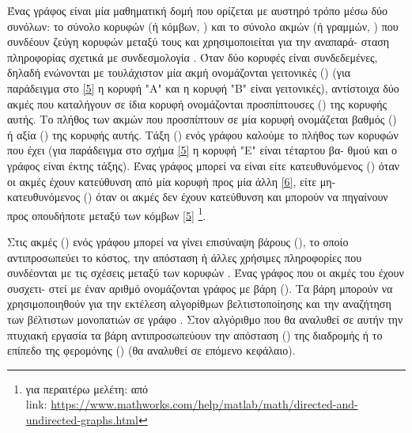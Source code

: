 Ένας γράφος είναι μία μαθηματική δομή που ορίζεται με αυστηρό τρόπο μέσω δύο συνόλων: το σύνολο κορυφών (ή κόμβων, ) και το σύνολο ακμών (ή γραμμών, ) που συνδέουν ζεύγη κορυφών μεταξύ τους και χρησιμοποιείται για την αναπαρά- σταση πληροφορίας σχετικά με συνδεσμολογία \cite{ntenisiwtis2023thewria}. Όταν δύο κορυφές είναι συνδεδεμένες, δηλαδή ενώνονται με τουλάχιστον μία ακμή ονομάζονται γειτονικές () (για παράδειγμα στο \ref{5} η κορυφή "Α" και η κορυφή "Β" είναι γειτονικές), αντίστοιχα δύο ακμές που καταλήγουν σε ίδια κορυφή ονομάζονται προσπίπτουσες () της κορυφής αυτής. Το πλήθος των ακμών που προσπίπτουν σε μία κορυφή ονομάζεται βαθμός () ή αξία () της κορυφής αυτής. Τάξη () ενός γράφου καλούμε το πλήθος των κορυφών που έχει (για παράδειγμα στο σχήμα \ref{5} η κορυφή "Ε" είναι τέταρτου βα- θμού και ο γράφος είναι έκτης τάξης). Ένας γράφος μπορεί να είναι είτε κατευθυνόμενος () όταν οι ακμές έχουν κατεύθυνση από μία κορυφή προς μία άλλη \ref{6}, είτε μη-κατευθυνόμενος () όταν οι ακμές δεν έχουν κατεύθυνση και μπορούν να πηγαίνουν προς οπουδήποτε μεταξύ των κόμβων \ref{5} \cite{gkertsis2023thewria} \footnote{για περαιτέρω μελέτη:  από \\ link: \url{https://www.mathworks.com/help/matlab/math/directed-and-undirected-graphs.html}}.

Στις ακμές () ενός γράφου μπορεί να γίνει επισύναψη βάρους (), το οποίο αντιπροσωπεύει το κόστος, την απόσταση ή άλλες χρήσιμες πληροφορίες που συνδέονται με τις σχέσεις μεταξύ των κορυφών . Ένας γράφος που οι ακμές του έχουν συσχετι- στεί με έναν αριθμό ονομάζονται γράφος με βάρη (). Τα βάρη μπορούν να χρησιμοποιηθούν για την εκτέλεση αλγορίθμων βελτιστοποίησης και την αναζήτηση των βέλτιστων μονοπατιών σε γράφο \cite{ntenisiwtis2023thewria, gkertsis2023thewria}. Στον αλγόριθμο που θα αναλυθεί σε αυτήν την πτυχιακή εργασία τα βάρη αντιπροσωπεύουν την απόσταση () της διαδρομής ή το επίπεδο της φερομόνης () (θα αναλυθεί σε επόμενο κεφάλαιο).



